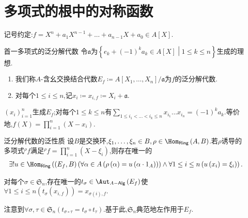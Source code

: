 \section{多项式的根中的对称函数}

记号约定:$f=X^{n}+a_{1}X^{n-1}+\ldots+a_{n-1}X+a_{0}\in A[X]$.

\begin{definition}{首一多项式的泛分解代数}{}
	令$\mathfrak{a}$为$\left\{e_{k}+\left(-1\right)^{k}a_{k}\in A[X]\middle|1\leq k\leq n\right\}$生成的理想.
	\begin{enumerate}
		\item 我们称$A$-含幺交换结合代数$E_{f}\coloneq A[X_{1},\ldots,X_{n}]/\mathfrak{a}$为$f$的泛分解代数.
		\item 对每个$1\leq i\leq n$,记$x_{i}\coloneq x_{i,f}\coloneq X_{i}+\mathfrak{a}$.
	\end{enumerate}
\end{definition}

\begin{remark}{}{}
	$\left(x_{i}\right)_{i=1}^{n}$生成$E_{f}$;对每个$1\leq k\leq n$有$\sum\limits_{1\leq i_{1}<\ldots<i_{k}\leq n}x_{i_{1}}\ldots x_{i_{n}}=\left(-1\right)^{k}a_{k}$.等价地,$f\left(X\right)=\prod\limits_{i=1}^{n}\left(X-x_{i}\right)$.
\end{remark}

\begin{proposition}{泛分解代数的泛性质}{}
	设$B$是交换环,$\xi_{1},\ldots,\xi_{n}\in B,\rho\in\Hom_{\mathsf{Ring}}\left(A,B\right)$.若$\rho$诱导的多项式$^{\rho}f$满足$^{\rho}f=\prod\limits_{i=1}^{n}\left(X-\xi_{i}\right)$,则存在唯一的
	\begin{align*}
		\exists!u\in\Hom_{\mathsf{Ring}}\left(\left(E_{f},B\right)\left(\forall\alpha\in A\left(\rho\left(\alpha\right)=u\left(\alpha\cdot 1_{A}\right)\right)\right)\wedge\forall 1\leq i\leq n\left(u\left(x_{i}\right)=\xi_{i}\right)\right).
	\end{align*}
\end{proposition}

\begin{proposition}{}{}
	对每个$\sigma\in\mathfrak{S}_{n}$,存在唯一的$t_{\sigma}\in\Aut_{A-\mathsf{Alg}}\left(E_{f}\right)$使$\forall 1\leq i\leq n\left(t_{\sigma}\left(x_{i,f}\right)\right)=x_{\sigma\left(i\right),f}$.
\end{proposition}

\begin{remark}{}{}
	注意到$\forall\sigma,\tau\in\mathfrak{S}_{n}\left(t_{\sigma\circ\tau}=t_{\sigma}\circ t_{\tau}\right)$.基于此,$\mathfrak{S}_{n}$典范地左作用于$E_{f}$.
\end{remark}

